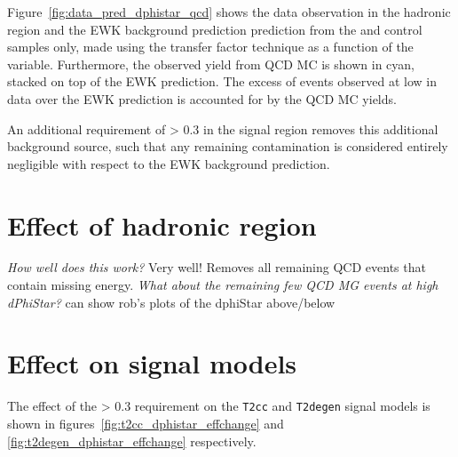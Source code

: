 Figure~\ref{fig:data_pred_dphistar_qcd} shows the data observation in the
hadronic region and the EWK background prediction prediction from the \mj and 
\mmj control samples only, made using the transfer factor technique as a
function of the \mindphistar variable. Furthermore, the observed yield from QCD
MC is shown in cyan, stacked on top of the EWK prediction. The excess of events
observed at low \mindphistar in data over the EWK prediction is accounted for by
the QCD MC yields.

An additional requirement of \mindphistar > 0.3 in the signal
region removes this additional background source, such that any remaining
contamination is considered entirely negligible with respect to the EWK
background prediction.



\section{Effect of hadronic region}

\emph{How well does this work?} Very well! Removes all remaining QCD events that
contain missing energy. \emph{What about the remaining few QCD MG events at high
dPhiStar?} can show rob's plots of the dphiStar above/below

\section{Effect on signal models}
The effect of the \mindphistar > 0.3 requirement on the \texttt{T2cc} and
\texttt{T2degen} signal models is shown in figures~\ref{fig:t2cc_dphistar_effchange}
and \ref{fig:t2degen_dphistar_effchange} respectively.

